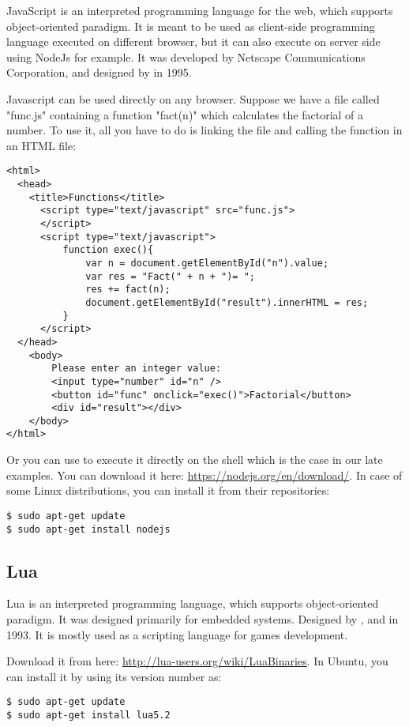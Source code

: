 \documentclass{KodeBook}
\begin{document}
JavaScript is an interpreted programming language for the web, which supports object-oriented paradigm. 
It is meant to be used as client-side programming language executed on different browser, but it can also execute on server side using NodeJs for example.
It was developed by Netscape Communications Corporation, and designed by  in 1995. 

Javascript can be used directly on any browser. 
Suppose we have a file called "func.js" containing a function "fact(n)" which calculates the factorial of a number. 
To use it, all you have to do is linking the file and calling the function in an HTML file:
\begin{lstlisting}[language={[KB]Javascript}, style=codeStyle]
<html>
  <head>
    <title>Functions</title>
      <script type="text/javascript" src="func.js">
      </script>
      <script type="text/javascript">
          function exec(){
              var n = document.getElementById("n").value;
              var res = "Fact(" + n + ")= ";
              res += fact(n);
              document.getElementById("result").innerHTML = res;
          }
      </script>
  </head>
    <body>
        Please enter an integer value: 
        <input type="number" id="n" />
        <button id="func" onclick="exec()">Factorial</button>
        <div id="result"></div>
    </body>
</html>
\end{lstlisting}


Or you can use  to execute it directly on the shell which is the case in our late examples. 
You can download it here: \url{https://nodejs.org/en/download/}. 
In case of some Linux distributions, you can install it from their repositories:
\begin{lstlisting}[style=shellStyle]
$ sudo apt-get update
$ sudo apt-get install nodejs
\end{lstlisting}

\subsection{Lua}

Lua is an interpreted programming language, which supports object-oriented paradigm. 
It was designed primarily for embedded systems.
Designed by ,  and  in 1993.
It is mostly used as a scripting language for games development.

Download it from here: \url{http://lua-users.org/wiki/LuaBinaries}. 
In Ubuntu, you can install it by using its version number as:
\begin{lstlisting}[style=shellStyle]
$ sudo apt-get update
$ sudo apt-get install lua5.2
\end{lstlisting}
\end{document}
